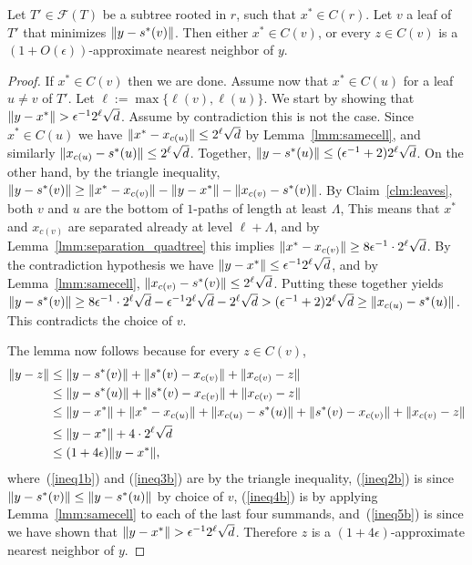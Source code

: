 \begin{lemma}\label{lmm:annrounds_quadtree}
Let $T'\in\mathcal F(T)$ be a subtree rooted in $r$, such that $x^*\in C(r)$.
Let $v$ a leaf of $T'$ that minimizes $\lVert y-s^*(v)\rVert$.
Then either $x^*\in C(v)$,
or every $z\in C(v)$ is a $(1+O(\epsilon))$-approximate nearest neighbor of $y$.
\end{lemma}
\begin{proof}
If $x^*\in C(v)$ then we are done. Assume now that $x^*\in C(u)$ for a leaf $u\neq v$ of $T'$.
Let $\ell:=\max\{\ell(v),\ell(u)\}$. We start by showing that $\lVert y-x^*\rVert>\epsilon^{-1}2^\ell\sqrt{d}$.
Assume by contradiction this is not the case.
Since $x^*\in C(u)$ we have $\lVert x^*-x_{c(u)}\rVert\leq2^{\ell}\sqrt{d}$ by Lemma~\ref{lmm:samecell}, and similarly $\lVert x_{c(u)}-s^*(u)\rVert\leq2^{\ell}\sqrt{d}$. Together, $\lVert y-s^*(u)\rVert\leq(\epsilon^{-1}+2)2^\ell\sqrt{d}$.
On the other hand, by the triangle inequality,
$\lVert y-s^*(v)\rVert \geq \lVert x^*-x_{c(v)}\rVert - \lVert y-x^*\rVert - \lVert x_{c(v)}-s^*(v)\rVert$.
By Claim~\ref{clm:leaves}, both $v$ and $u$ are the bottom of $1$-paths of length at least $\Lambda$, This means that $x^*$ and $x_{c(v)}$ are separated already at level $\ell+\Lambda$, and by Lemma~\ref{lmm:separation_quadtree} this implies $\lVert x^*-x_{c(v)}\rVert\geq8\epsilon^{-1}\cdot2^{\ell}\sqrt{d}$. By the contradiction hypothesis we have $\lVert y-x^*\rVert\leq\epsilon^{-1}2^\ell\sqrt{d}$, and by Lemma~\ref{lmm:samecell}, $\lVert x_{c(v)}-s^*(v)\rVert\leq2^\ell\sqrt{d}$. 
Putting these together yields $\lVert y-s^*(v)\rVert\geq8\epsilon^{-1}\cdot2^{\ell}\sqrt{d}-\epsilon^{-1}2^\ell\sqrt{d}-2^\ell\sqrt{d} > (\epsilon^{-1}+2)2^\ell\sqrt{d}\geq \lVert x_{c(u)}-s^*(u)\rVert$. This contradicts the choice of $v$.

The lemma now follows because for every $z\in C(v)$,
\begin{align}
\lVert y-z\rVert &\leq \lVert y-s^*(v)\rVert + \lVert s^*(v)-x_{c(v)}\rVert + \lVert x_{c(v)}-z\rVert \label{ineq1b} \\
&\leq \lVert y-s^*(u)\rVert + \lVert s^*(v)-x_{c(v)}\rVert + \lVert x_{c(v)}-z\rVert \label{ineq2b} \\
&\leq \lVert y-x^*\rVert + \lVert x^*-x_{c(u)}\rVert + \lVert x_{c(u)}-s^*(u)\rVert +\lVert s^*(v)-x_{c(v)}\rVert + \lVert x_{c(v)}-z\rVert \label{ineq3b} \\
&\leq \lVert y-x^*\rVert + 4\cdot2^\ell\sqrt{d} \label{ineq4b} \\
&\leq (1+4\epsilon)\lVert y-x^*\rVert, \label{ineq5b}
\end{align}
where~(\ref{ineq1b}) and (\ref{ineq3b}) are by the triangle inequality, (\ref{ineq2b}) is since $\lVert y-s^*(v)\rVert\leq\lVert y-s^*(u)\rVert$ by choice of $v$, (\ref{ineq4b}) is by applying Lemma~\ref{lmm:samecell} to each of the last four summands, and~(\ref{ineq5b}) is since we have shown that $\lVert y-x^*\rVert>\epsilon^{-1}2^\ell\sqrt{d}$.
Therefore $z$ is a $(1+4\epsilon)$-approximate nearest neighbor of $y$.
\end{proof}

